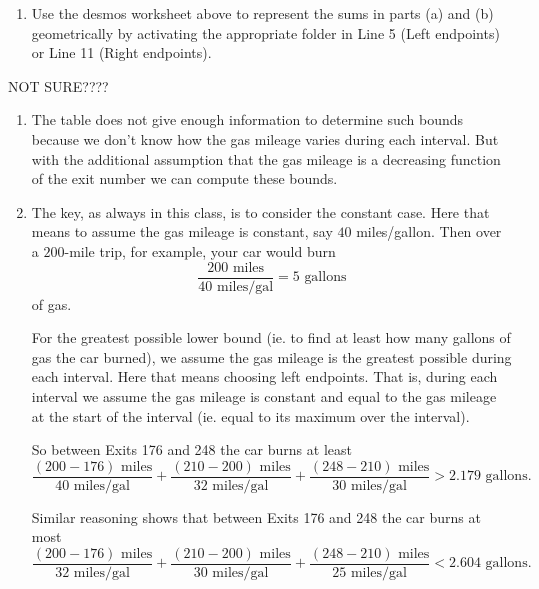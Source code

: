 \documentclass{ximera}
\begin{document}
\begin{exercise}
\begin{enumerate}
\item Use the desmos worksheet above to represent the sums in parts (a) and (b) geometrically by activating the appropriate folder in Line 5 (Left endpoints) or Line 11 (Right endpoints).  %
\end{enumerate}

NOT SURE????


\begin{explanation}
\begin{enumerate}
\item The table does not give enough information to determine such bounds because we don't know how the gas mileage varies during each interval. But with the additional assumption that the gas mileage is a decreasing function of the exit number we can compute these bounds.

\item The key, as always in this class, is to consider the constant case. Here that means to assume the gas mileage is constant, say $40$ miles/gallon. Then over a $200$-mile trip, for example, your car would burn
\[
      \frac{200 \text{ miles}}{40 \text{ miles/gal}} = 5\text{ gallons}
\]
of gas. 

For the greatest possible lower bound (ie. to find at least how many gallons of gas the car burned), we assume the gas mileage is the greatest possible during each interval. Here that means choosing left endpoints. That is, during each interval we assume the gas mileage is constant and equal to the gas mileage at the start of the interval (ie. equal to its maximum over the interval).

So between Exits 176 and 248 the car burns at least
\[
   \frac{(200-176) \text{ miles}}{40 \text{ miles/gal}} +  \frac{(210 - 200) \text{ miles}}{32 \text{ miles/gal}} + \frac{(248 - 210) \text{ miles}}{30 \text{ miles/gal}} > 2.179 \text{ gallons}.
\] 

Similar reasoning shows that between Exits 176 and 248 the car burns at most
\[
   \frac{(200-176) \text{ miles}}{32 \text{ miles/gal}} +  \frac{(210 - 200) \text{ miles}}{30 \text{ miles/gal}} + \frac{(248 - 210) \text{ miles}}{25 \text{ miles/gal}} < 2.604 \text{ gallons}.
\] 

\end{enumerate}
\end{explanation}


\end{exercise}
\end{document}
